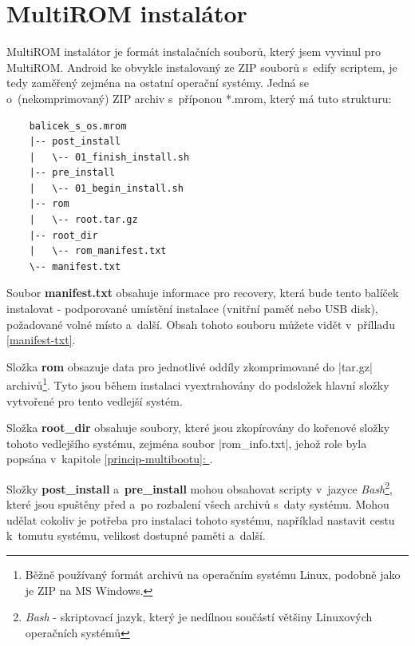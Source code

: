 \documentclass[12pt, a4paper, oneside]{article}
\newcommand{\B}{\textbf} %
\newcommand{\It}{\textit}  %
\newcommand*{\fullref}[1]{\hyperref[{#1}]{\ref*{#1}: \uv{\nameref*{#1}}}}
\begin{document}
\section*{MultiROM instalátor}
\label{sec:installer}
MultiROM instalátor je formát instalačních souborů, který jsem vyvinul pro MultiROM. Android ke obvykle instalovaný ze ZIP souborů s~edify scriptem, je tedy zaměřený zejména na ostatní operační systémy. Jedná se o~(nekomprimovaný) ZIP archiv s~příponou *.mrom, který má tuto strukturu:
\begin{verbatim}
    balicek_s_os.mrom
    |-- post_install
    |   \-- 01_finish_install.sh
    |-- pre_install
    |   \-- 01_begin_install.sh
    |-- rom
    |   \-- root.tar.gz
    |-- root_dir
    |   \-- rom_manifest.txt
    \-- manifest.txt
\end{verbatim}

Soubor \B{manifest.txt} obsahuje informace pro recovery, která bude tento balíček instalovat - podporované umístění instalace (vnitřní paměť nebo USB disk), požadované volné místo a~další. Obsah tohoto souboru můžete vidět v~přílladu \ref{manifest-txt}.

Složka \B{rom} obsazuje data pro jednotlivé oddíly zkomprimované do |tar.gz| archivů\footnote{Běžně používaný formát archivů na operačním systému Linux, podobně jako je ZIP na MS Windows.}. Tyto jsou během instalaci vyextrahovány do podsložek hlavní složky vytvořené pro tento vedlejší systém.

Složka \B{root\_dir} obsahuje soubory, které jsou zkopírovány do kořenové složky tohoto vedlejšího systému, zejména soubor |rom_info.txt|, jehož role byla popsána v~kapitole \fullref{princip-multibootu}.

Složky \B{post\_install} a~\B{pre\_install} mohou obsahovat scripty v~jazyce \It{Bash}\footnote{\It{Bash} - skriptovací jazyk, který je nedílnou součástí většiny Linuxových operačních systémů}, které jsou spuštěny před a~po rozbalení všech archivů s~daty systému. Mohou udělat cokoliv je potřeba pro instalaci tohoto systému, například nastavit cestu k~tomutu systému, velikost dostupné paměti a~další.
\end{document}

